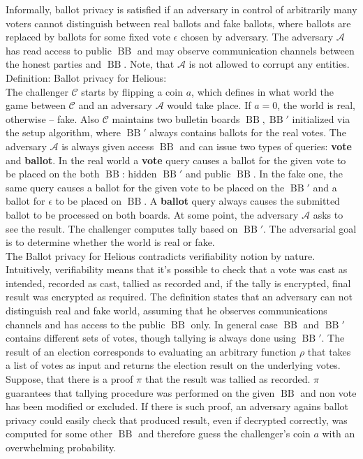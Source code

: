 \documentclass[12pt]{article}
\DeclareMathOperator{\bb}{BB}
\begin{document}
Informally, ballot privacy is satisfied if an adversary in control of arbitrarily many voters cannot distinguish between real ballots and fake ballots, where ballots are replaced by ballots for some fixed vote $\epsilon$ chosen by adversary. The adversary $\mathcal{A}$ has read access to public $\bb$ and may observe communication channels between the honest parties and $\bb$. Note, that $\mathcal{A}$  is not allowed to corrupt any entities. \\

Definition: Ballot privacy for Helious:\\
The challenger $\mathcal{C}$ starts by flipping a coin $a$, which defines in what world the game between $\mathcal{C}$ and an adversary  $\mathcal{A}$ would take place.  If $a=0$, the world is real, otherwise -- fake. Also $\mathcal{C}$  maintains two bulletin boards $\bb,\bb'$ initialized via the setup algorithm, where $\bb'$ always contains ballots for the real votes.  The adversary $\mathcal{A}$ is always given access $\bb$ and can issue two types of queries: \textbf{vote} and \textbf{ballot}.  In the real world a \textbf{vote} query causes a ballot for the given vote to be placed on the both $\bb$: hidden $\bb'$ and public $\bb$. In the fake one, the same query causes a ballot for the given vote to be placed on the $\bb'$ and a ballot for $\epsilon$  to be placed on $\bb$. A \textbf{ballot} query always causes the submitted ballot to be processed on both boards. At some point, the adversary $\mathcal{A}$ asks to see the result. The challenger computes tally based on $\bb'$. The adversarial goal is to determine whether the world is real or fake.\\

The Ballot privacy for Helious contradicts verifiability notion by nature. Intuitively, verifiability means that it's possible to check that a vote was cast as intended, recorded as cast, tallied as recorded and, if the tally is encrypted, final result was encrypted as required. The definition states that an adversary can not distinguish real and fake world, assuming that he observes communications channels and has access to the public $\bb$ only. In general case $\bb$ and $\bb'$ contains different sets of votes, though tallying is always done using $\bb'$. The result of an election corresponds to evaluating an arbitrary function $\rho$ that takes a list of votes as input and returns the election result on the underlying votes. Suppose, that there is a proof $\pi$ that the result was tallied as recorded. $\pi$ guarantees that tallying procedure was performed on the given $\bb$ and non vote has been modified or excluded. If there is such proof, an adversary agains ballot privacy could easily check that produced result, even if decrypted correctly, was computed for some other $\bb$ and therefore guess the challenger's coin $a$ with an overwhelming probability. \\
\end{document}
